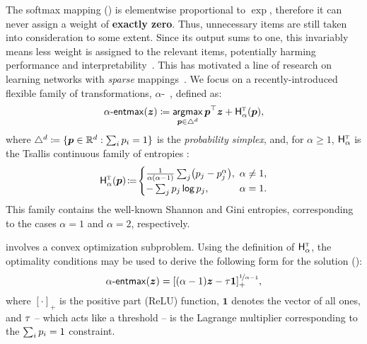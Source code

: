 The softmax mapping () is elementwise
proportional to $\exp$, therefore it can never assign a weight of
\textbf{exactly zero}. Thus, unnecessary items are still taken into
consideration to some extent. Since its output sums to one, this
invariably means less weight is assigned to the relevant items,
potentially harming performance and
interpretability~\citep{jain2019attention}. This has motivated a line
of research on learning networks with \emph{sparse}
mappings~\citep{sparsemax,fusedmax,louizos,shao2019ssn}. We focus on
a recently-introduced flexible family of transformations,
$\alpha$-\entmaxtext~\citep{blondel2019learning,entmax}, defined as:
%
\begin{equation}\label{eq:define_entmax}
    \mathop{\mathsf{\alpha}\textnormal{-}\mathsf{entmax}}(\bm{z}) \coloneqq
    \operatorname*{\mathsf{argmax}}_{\bm{p} \in \triangle^d} \bm{p}^\top\bm{z} + \mathsf{H}^{{\textsc{t}}}_{\alpha}(\bm{p}),
\end{equation}
%
where $\triangle^d \coloneqq
    \{\bm{p} \in \mathbb{R}^d:\sum_{i} p_i = 1\}$
is the \emph{probability simplex}, and, for $\alpha\geq1$,
$\mathsf{H}^{{\textsc{t}}}_\alpha$ is the Tsallis continuous family of entropies
\citep{Tsallis1988}:
%
\begin{equation}\label{eq:tsallisdef}
    \HHt_{\alpha}(\bm{p})\!\coloneqq\!
    \begin{cases}
        \frac{1}{\alpha(\alpha-1)}\sum_j\!\left(p_j - p_j^\alpha\right)\!, &
        \!\!\!\alpha \ne 1,                                                  \\
        -\sum_j \pp_j \log \pp_j,                                          &
        \!\!\!\alpha = 1.
    \end{cases}
\end{equation}
%
This family contains the well-known Shannon and Gini entropies,
corresponding to the cases $\alpha=1$ and $\alpha=2$, respectively.

 involves a convex optimization subproblem. Using the
definition of $\mathsf{H}^{{\textsc{t}}}_\alpha$, the optimality conditions may be used to derive the
following form for the solution ():
%
\begin{equation}\label{eq:entmax_form}
    \mathop{\mathsf{\alpha}\textnormal{-}\mathsf{entmax}}(\bm{z}) = [(\alpha - 1){\bm{z}} - \tau \bm{1}]_+^{\nicefrac{1}{\alpha-1}},
\end{equation}
%
where $[\cdot]_+$ is the positive part (ReLU) function, $\bm{1}$
denotes the vector of all ones, and $\tau$ -- which acts like a
threshold -- is the Lagrange multiplier corresponding to the $\sum_i
    p_i=1$ constraint.

